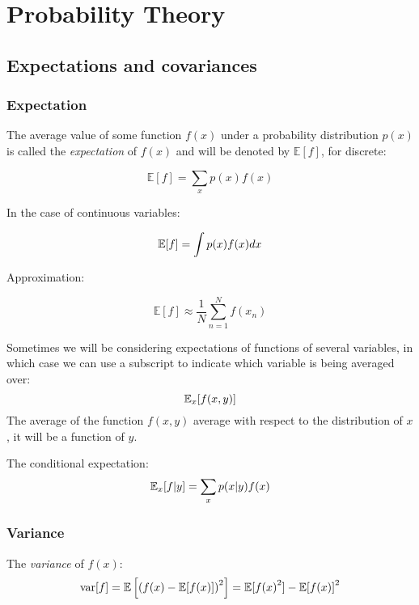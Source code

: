\chapter{Probability Theory}
\section{Expectations and covariances}
\subsection{Expectation}
The average value of some function $f(x)$ under a probability
distribution $p(x)$ is called the \emph{expectation} of $f(x)$ and will be
denoted by $\mathbb{E}[f]$, for discrete:

\begin{equation}
    \mathbb{E}[f] = \sum_x p(x) f(x)
    \label{expectation-discrete}
\end{equation}

In the case of continuous variables:

\begin{equation}
    \mathbb{E}[f] = \int p(x) f(x) dx
    \label{expectation-cont}
\end{equation}

Approximation:

\begin{equation}
    \mathbb{E}[f] \approx \frac{1}{N} \sum_{n=1}^N f(x_n)
    \label{expectation-approx}
\end{equation}

Sometimes we will be considering expectations of functions of several
variables, in which case we can use a subscript to indicate which variable
is being averaged over:
\begin{equation}
    \mathbb{E}_x[f(x,y)]
    \label{partial-avg}
\end{equation}
The average of the function $f(x, y)$ average with respect to the
distribution of $x$, it will be a function of $y$.

The conditional expectation:
\begin{equation}
    \mathbb{E}_x[f|y] = \sum_x p(x|y) f(x)
    \label{conditional-expectation}
\end{equation}

\subsection{Variance}
The \emph{variance} of $f(x)$:
\begin{equation}
    \mbox{var}[f] = \mathbb{E}\left[ {(f(x) - \mathbb{E}[f(x)])}^2 \right] = \mathbb{E}[{f(x)}^2] -
    {\mathbb{E}[f(x)]}^2
    \label{var}
\end{equation}

